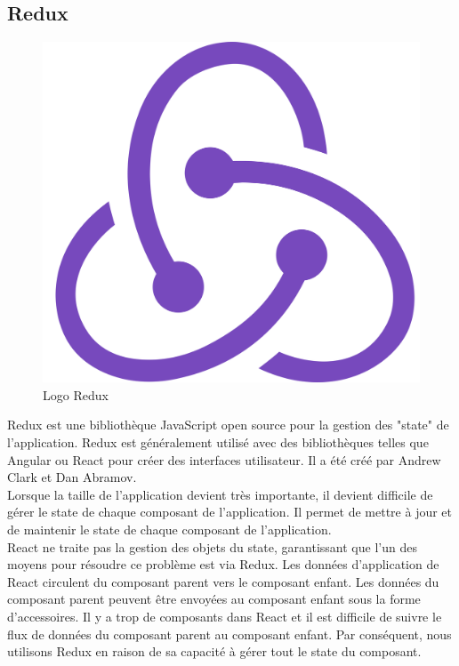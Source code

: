     \subsection{Redux}
    \begin{figure}[H]
        \centering
        \includegraphics[scale=0.2]{ACR/redux-logo.png}
        \caption{Logo Redux}
    \end{figure}

    Redux\cite{redux} est une bibliothèque JavaScript open source pour la gestion des "state" de l'application. Redux est généralement utilisé avec des bibliothèques telles que Angular ou React pour créer des interfaces utilisateur. Il a été créé par Andrew Clark et Dan Abramov.\\
    
    Lorsque la taille de l'application devient très importante, il devient difficile de gérer le state de chaque composant de l'application. Il permet de mettre à jour et de maintenir le state de chaque composant de l'application.\\

    React ne traite pas la gestion des objets du state, garantissant que l'un des moyens pour résoudre ce problème est via Redux. Les données d'application de React circulent du composant parent vers le composant enfant. Les données du composant parent peuvent être envoyées au composant enfant sous la forme d'accessoires. Il y a trop de composants dans React et il est difficile de suivre le flux de données du composant parent au composant enfant. Par conséquent, nous utilisons Redux en raison de sa capacité à gérer tout le state du composant.\\

